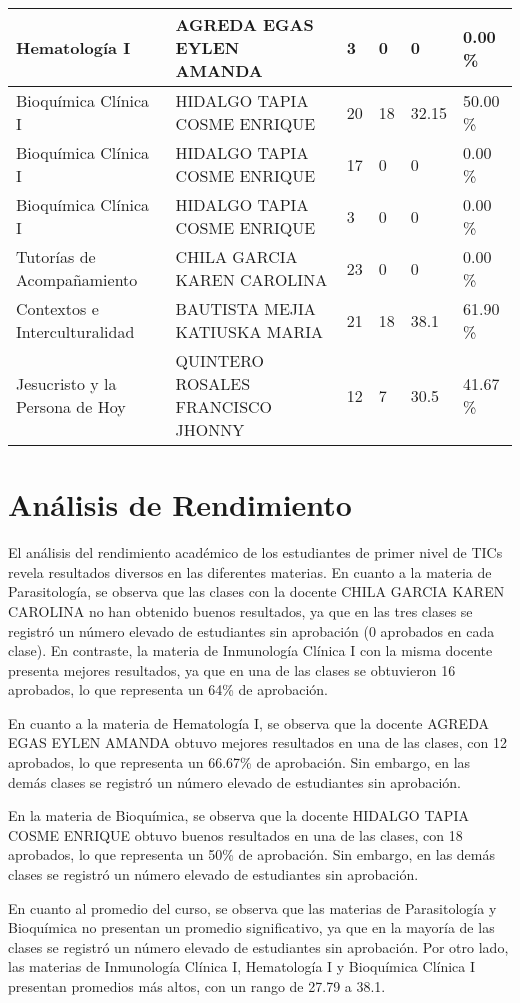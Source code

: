 \begin{tabularx}{\textwidth}{|p{2.5cm}|p{2.5cm}|X|X|X|X|}
Hematología I & AGREDA EGAS EYLEN AMANDA & 3 & 0 & 0 & 0.00 \%\\ \hline
Bioquímica Clínica I & HIDALGO TAPIA COSME ENRIQUE & 20 & 18 & 32.15 & 50.00 \%\\ \hline
Bioquímica Clínica I & HIDALGO TAPIA COSME ENRIQUE & 17 & 0 & 0 & 0.00 \%\\ \hline
Bioquímica Clínica I & HIDALGO TAPIA COSME ENRIQUE & 3 & 0 & 0 & 0.00 \%\\ \hline
Tutorías de Acompañamiento & CHILA GARCIA KAREN CAROLINA & 23 & 0 & 0 & 0.00 \%\\ \hline
Contextos e Interculturalidad & BAUTISTA MEJIA KATIUSKA MARIA & 21 & 18 & 38.1 & 61.90 \%\\ \hline
Jesucristo y la Persona de Hoy & QUINTERO ROSALES FRANCISCO JHONNY & 12 & 7 & 30.5 & 41.67 \%\\ \hline
\end{tabularx}

\vspace{1cm}
\section{Análisis de Rendimiento}
El análisis del rendimiento académico de los estudiantes de primer nivel de TICs revela resultados diversos en las diferentes materias. En cuanto a la materia de Parasitología, se observa que las clases con la docente CHILA GARCIA KAREN CAROLINA no han obtenido buenos resultados, ya que en las tres clases se registró un número elevado de estudiantes sin aprobación (0 aprobados en cada clase). En contraste, la materia de Inmunología Clínica I con la misma docente presenta mejores resultados, ya que en una de las clases se obtuvieron 16 aprobados, lo que representa un 64\% de aprobación.

En cuanto a la materia de Hematología I, se observa que la docente AGREDA EGAS EYLEN AMANDA obtuvo mejores resultados en una de las clases, con 12 aprobados, lo que representa un 66.67\% de aprobación. Sin embargo, en las demás clases se registró un número elevado de estudiantes sin aprobación.

En la materia de Bioquímica, se observa que la docente HIDALGO TAPIA COSME ENRIQUE obtuvo buenos resultados en una de las clases, con 18 aprobados, lo que representa un 50\% de aprobación. Sin embargo, en las demás clases se registró un número elevado de estudiantes sin aprobación.

En cuanto al promedio del curso, se observa que las materias de Parasitología y Bioquímica no presentan un promedio significativo, ya que en la mayoría de las clases se registró un número elevado de estudiantes sin aprobación. Por otro lado, las materias de Inmunología Clínica I, Hematología I y Bioquímica Clínica I presentan promedios más altos, con un rango de 27.79 a 38.1.

